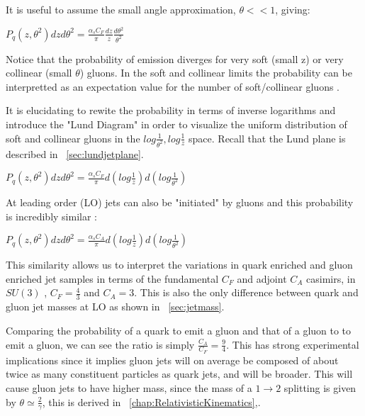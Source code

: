 It is useful to assume the small angle approximation, $\theta << 1$, giving:\newline


$P_q(z,\theta^2) dz d \theta^2 = \frac{\alpha_s C_F}{\pi}  \frac{dz}{z} \frac{d \theta^2}{ \theta^2}  $\newline

Notice that the probability of emission diverges for very soft (small z) or very collinear (small $\theta$) gluons. In the soft and collinear limits the probability can be interpretted as an expectation value for the number of soft/collinear gluons \cite{Larkoski:2017fip}.

It is elucidating to rewite the probability in terms of inverse logarithms and introduce the "Lund Diagram" in order to visualize the uniform distribution of soft and collinear gluons in the $log \frac{1}{ \theta^2} , log\frac{1}{z} $ space. Recall that the Lund plane is described in ~\ref{sec:lundjetplane}.




$P_q(z,\theta^2) dz d \theta^2 = \frac{\alpha_s C_F}{\pi} d( log\frac{1}{z}  ) d(log \frac{1}{ \theta^2})  $\newline

At leading order (LO) jets can also be "initiated" by gluons and this probability is incredibly similar :


$P_q(z,\theta^2) dz d \theta^2 = \frac{\alpha_s C_A}{\pi} d( log\frac{1}{z}  ) d(log \frac{1}{ \theta^2})  $\newline


This similarity allows us to interpret the variations in quark enriched and gluon enriched jet samples in terms of the fundamental $C_F$ and adjoint $C_A$ casimirs, in $SU(3)$ ,   $C_F = \frac{4}{3}$ and $C_A=3$. This is also the only difference between quark and gluon jet masses at LO as shown in ~\ref{sec:jetmass}.


Comparing the probability of a quark to emit a gluon and that of a gluon to to emit a gluon, we can see the ratio is simply $\frac{C_A}{C_F} =\frac{9}{4} $. This has strong experimental implications since it implies gluon jets will on average be composed of about twice as many constituent particles as quark jets, and will be broader. This will cause gluon jets to have higher mass, since the mass of a $1 \rightarrow 2 $ splitting is given by $\theta \simeq \frac{2}{\gamma} $, this is derived in ~\ref{chap:RelativisticKinematics},.




